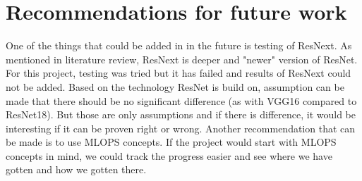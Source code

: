 \section{Recommendations for future work} %
One of the things that could be added in in the future is testing of ResNext. As mentioned in literature review, ResNext is deeper and "newer" version of ResNet. For this project, testing was tried but it has failed and results of ResNext could not be added. Based on the technology ResNet is build on, assumption can be made that there should be no significant difference (as with VGG16 compared to ResNet18). But those are only assumptions and if there is difference, it would be interesting if it can be proven right or wrong.
\newline
Another recommendation that can be made is to use MLOPS concepts. If the project would start with MLOPS concepts in mind, we could track the progress easier and see where we have gotten and how we gotten there.
\newpage